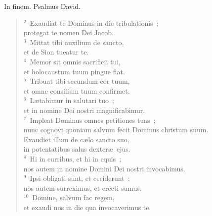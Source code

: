 \lettrine[lines=3,image=true,loversize=0.05,lraise=-0.03]{I}{}n finem. Psalmus David.
\begin{flushleft}\begin{verse}\vspace{6pt}${}^{2}$~Exaudiat te Dominus in die tribulationis~;\\ protegat te nomen Dei Jacob.\\
${}^{3}$~Mittat tibi auxilium de sancto,\\ et de Sion tueatur te.\\
${}^{4}$~Memor sit omnis sacrificii tui,\\ et holocaustum tuum pingue fiat.\\
${}^{5}$~Tribuat tibi secundum cor tuum,\\ et omne consilium tuum confirmet.\\
${}^{6}$~L\ae tabimur in salutari tuo~;\\ et in nomine Dei nostri magnificabimur.\\
${}^{7}$~Impleat Dominus omnes petitiones tuas~;\\ nunc cognovi quoniam salvum fecit Dominus christum suum.\\ Exaudiet illum de c\ae lo sancto suo,\\ in potentatibus salus dexter\ae\ ejus.\\
${}^{8}$~Hi in curribus, et hi in equis~;\\ nos autem in nomine Domini Dei nostri invocabimus.\\
${}^{9}$~Ipsi obligati sunt, et ceciderunt~;\\ nos autem surreximus, et erecti sumus.\\
${}^{10}$~Domine, salvum fac regem,\\ et exaudi nos in die qua invocaverimus te.\end{verse}\end{flushleft}



